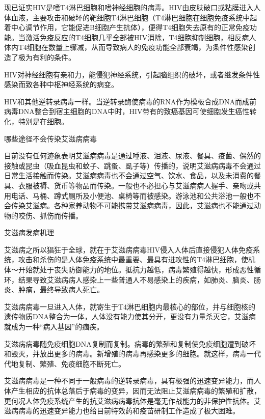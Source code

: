 \documentclass[12pt,UTF8]{ctexbook}
\begin{document}
现已证实HIV是嗜T4淋巴细胞和嗜神经细胞的病毒。HIV由皮肤破口或粘膜进入人体血液，主要攻击和破坏的靶细胞T4淋巴细胞（T4淋巴细胞在细胞免疫系统中起着中心调节作用，它能促进B细胞产生抗体），便得T4细胞失去原有的正常免疫功能。当激活免疫反应的T4细胞几乎全部被HIV消除，T4细胞抑制细胞，相反病人体内T4细胞在数量上骤减，从而导致病人的免疫功能全部衰竭，为条件性感染创造了极为有利的条件。

HIV对神经细胞有亲和力，能侵犯神经系统，引起脑组织的破坏，或者继发条件性感染而致各种中枢神经系统的病变。

HIV和其他逆转录病毒一样。当逆转录酶使病毒的RNA作为模板合成DNA而成前病毒DNA整合到宿主细胞的DNA中时，HIV带有的致癌基因可使细胞发生癌性转化，特别是在细胞。





哪些途径不会传染艾滋病病毒


目前没有任何迹象表明艾滋病病毒是通过唾液、泪液、尿液、餐具、疫菌、偶然的接触或昆虫（吸血昆虫和蚊子、跳蚤、虱子等）传播的，说明艾滋病病毒不会通过日常生活接触而传染。艾滋病病毒也不会通过空气、饮水、食品，以及未消费的餐具、衣服被褥、货币等物品而传染。一般也不必担心与艾滋病病人握手、亲吻或共用电话、马桶、蹲式厕所及小便池、桌椅等而被感染。游泳池和公共浴池一般也不会传染艾滋病。各种家养动物不可能携带艾滋病病毒，因此，艾滋病也不能通过动物的咬伤、抓伤而传播。





艾滋病发病机理


艾滋病之所以猖狂于全球，就在于艾滋病病毒HIV侵入人体后直接侵犯人体免疫系统，攻击和杀伤的是人体免疫系统中最重要、最具有进攻性的T4淋巴细胞，使机体～开始就处于丧失防御能力的地位。抵抗力越低，病毒繁殖得越快，形成恶性循环，结果导致艾滋病病人感染上一些普通人不易感染上的疾病，如肺炎、脑炎、肠炎、肿瘤，最终导致病人死亡。

艾滋病病毒一旦进入人体，就寄生于T4淋巴细胞内最核心的部位，并与细胞核的遗传物质DNA整合为一体，人体没有能力使其分开，更没有力量杀灭它，艾滋病就成为一种“病入基因”的痼疾。

艾滋病病毒随免疫细胞DNA复制而复制。病毒的繁殖和复制使免疫细胞遭到破坏和毁灭，并放出更多的病毒。新增殖的病毒再感染更多的细胞。就这样，病毒一代代地复制、繁殖、免疫细胞不断死亡。

艾滋病病毒是一种不同于一般病毒的逆转录病毒，具有极强的迅速变异能力，而人体产生相应的抗体总落后于病毒的变异，因而无法阻止艾滋病病毒的繁殖和扩散，更何况人体免疫系统产生的抗艾滋病病毒抗体是毫无作战能力的非保护性抗体。艾滋病病毒的迅速变异能力也给目前特效药和疫苗研制工作造成了极大困难。
\end{document}
